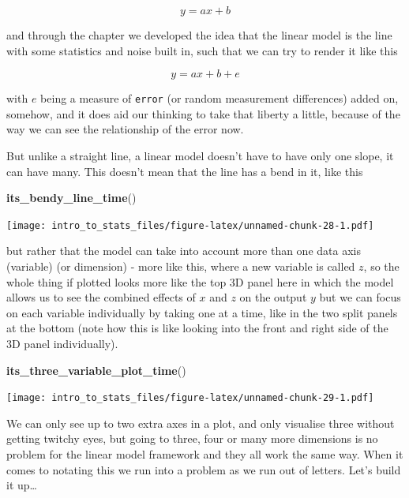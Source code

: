 \documentclass[
]{book}
\newenvironment{Shaded}{\begin{snugshade}}{\end{snugshade}}
\newcommand{\KeywordTok}[1]{\textcolor[rgb]{0.13,0.29,0.53}{\textbf{#1}}}
\newcommand{\NormalTok}[1]{#1}
\begin{document}
\begin{equation}
 y = ax + b
\end{equation}

and through the chapter we developed the idea that the linear model is the line with some statistics and noise built in, such that we can try to render it like this

\begin{equation}
 y = ax + b + e
\end{equation}

with \(e\) being a measure of \texttt{error} (or random measurement differences) added on, somehow, and it does aid our thinking to take that liberty a little, because of the way we can see the relationship of the error now.

But unlike a straight line, a linear model doesn't have to have only one slope, it can have many. This doesn't mean that the line has a bend in it, like this

\begin{Shaded}
\begin{Highlighting}[]
\KeywordTok{its_bendy_line_time}\NormalTok{()}
\end{Highlighting}
\end{Shaded}

\texttt{[image: intro\_to\_stats\_files/figure-latex/unnamed-chunk-28-1.pdf]}

but rather that the model can take into account more than one data axis (variable) (or dimension) - more like this, where a new variable is called \(z\), so the whole thing if plotted looks more like the top 3D panel here in which the model allows us to see the combined effects of \(x\) and \(z\) on the output \(y\) but we can focus on each variable individually by taking one at a time, like in the two split panels at the bottom (note how this is like looking into the front and right side of the 3D panel individually).

\begin{Shaded}
\begin{Highlighting}[]
\KeywordTok{its_three_variable_plot_time}\NormalTok{()}
\end{Highlighting}
\end{Shaded}

\texttt{[image: intro\_to\_stats\_files/figure-latex/unnamed-chunk-29-1.pdf]}

We can only see up to two extra axes in a plot, and only visualise three without getting twitchy eyes, but going to three, four or many more dimensions is no problem for the linear model framework and they all work the same way. When it comes to notating this we run into a problem as we run out of letters. Let's build it up\ldots{}
\end{document}
